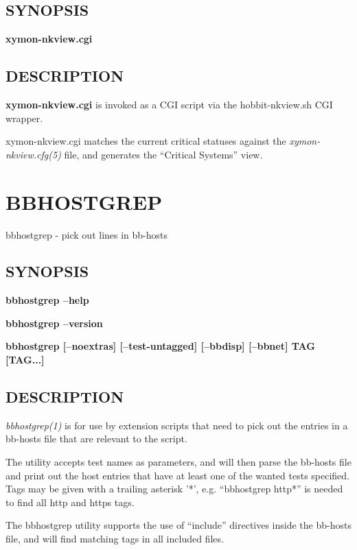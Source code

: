 \subsection{SYNOPSIS}
\textbf{xymon-nkview.cgi}


 
\subsection{DESCRIPTION}
\textbf{xymon-nkview.cgi} is invoked as a CGI script via the hobbit-nkview.sh CGI wrapper. 

  xymon-nkview.cgi matches the current critical statuses against the
  \emph{xymon-nkview.cfg(5)} file, and generates the ``Critical
  Systems'' view. 


%
\newpage
\section{BBHOSTGREP}

 bbhostgrep - pick out lines in bb-hosts

 \subsection{SYNOPSIS}
\textbf{bbhostgrep --help}
 
\textbf{bbhostgrep --version}
 
\textbf{bbhostgrep [--noextras] [--test-untagged] [--bbdisp] [--bbnet] TAG [TAG...]}


 
\subsection{DESCRIPTION}
\emph{bbhostgrep(1)}
 is for use by extension scripts that need to pick out the entries in
 a bb-hosts file that are relevant to the script. 


  The utility accepts test names as parameters, and will then parse
  the bb-hosts file and print out the host entries that have at least
  one of the wanted tests specified. Tags may be given with a trailing
  asterisk '*', e.g. ``bbhostgrep http*'' is needed to find all http
  and https tags. 



  The bbhostgrep utility supports the use of ``include'' directives
  inside the bb-hosts file, and will find matching tags in all
  included files. 



